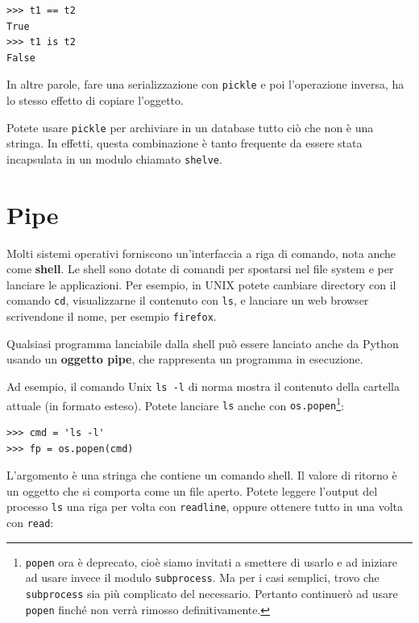\documentclass[10pt]{book}
\begin{document}
\begin{verbatim}
>>> t1 == t2
True
>>> t1 is t2
False
\end{verbatim}
%
In altre parole, fare una serializzazione con {\tt pickle} e poi l'operazione inversa, ha lo stesso effetto di copiare l'oggetto.

Potete usare {\tt pickle} per archiviare in un database tutto ciò che non è una stringa. In effetti, questa combinazione è tanto frequente da essere stata incapsulata in un modulo chiamato {\tt shelve}.  


\section{Pipe}

Molti sistemi operativi forniscono un'interfaccia a riga di comando, nota anche come {\bf shell}.  Le shell sono dotate di comandi per spostarsi nel file system e per lanciare le applicazioni. Per esempio, in UNIX potete cambiare directory con il comando {\tt cd},
visualizzarne il contenuto con {\tt ls}, e lanciare un web browser scrivendone il nome, per esempio {\tt firefox}.

Qualsiasi programma lanciabile dalla shell può essere lanciato anche da Python usando un {\bf oggetto pipe}, che rappresenta un programma in esecuzione.

Ad esempio, il comando Unix {\tt ls -l} di norma mostra il contenuto della cartella attuale (in formato esteso). Potete lanciare {\tt ls} anche con {\tt os.popen}\footnote{{\tt popen} ora è deprecato, cioè siamo invitati a smettere di usarlo e ad iniziare ad usare invece il modulo {\tt subprocess}. Ma per i casi semplici, trovo che
{\tt subprocess} sia più complicato del necessario. Pertanto continuerò ad usare {\tt popen} finché non verrà rimosso definitivamente.}:

\begin{verbatim}
>>> cmd = 'ls -l'
>>> fp = os.popen(cmd)
\end{verbatim}
%
L'argomento è una stringa che contiene un comando shell. Il valore di ritorno è un oggetto che si comporta come un file aperto. Potete leggere l'output del processo {\tt ls} una riga per volta con {\tt readline}, oppure ottenere tutto in una volta con {\tt read}:
\end{document}
